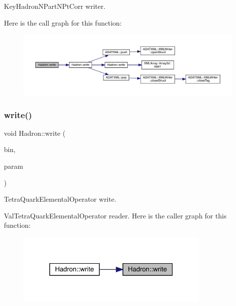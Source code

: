 Key\+Hadron\+N\+Part\+N\+Pt\+Corr writer. 

Here is the call graph for this function\+:
\nopagebreak
\begin{figure}[H]
\begin{center}
\leavevmode
\includegraphics[width=350pt]{d1/daf/namespaceHadron_aef02c5c2c485a766d9e66d0dabe73f62_cgraph}
\end{center}
\end{figure}
\mbox{\label{namespaceHadron_ac78ff88ef705b3eaa48d7d440fe2a299}} 
\subsubsection{\texorpdfstring{write()}{write()}\hspace{0.1cm}{\footnotesize\ttfamily [54/95]}}
{\footnotesize\ttfamily void Hadron\+::write (\begin{DoxyParamCaption}\item[{\mbox{\hyperlink{classADATIO_1_1BinaryWriter}{Binary\+Writer}} \&}]{bin,  }\item[{const \mbox{\hyperlink{structHadron_1_1ValTetraQuarkElementalOperator__t}{Val\+Tetra\+Quark\+Elemental\+Operator\+\_\+t}} \&}]{param }\end{DoxyParamCaption})}



Tetra\+Quark\+Elemental\+Operator write. 

Val\+Tetra\+Quark\+Elemental\+Operator reader. Here is the caller graph for this function\+:
\nopagebreak
\begin{figure}[H]
\begin{center}
\leavevmode
\includegraphics[width=267pt]{d1/daf/namespaceHadron_ac78ff88ef705b3eaa48d7d440fe2a299_icgraph}
\end{center}
\end{figure}
\mbox{\label{namespaceHadron_a767bdf4c228c06edad1c47918ec75ed3}} 
